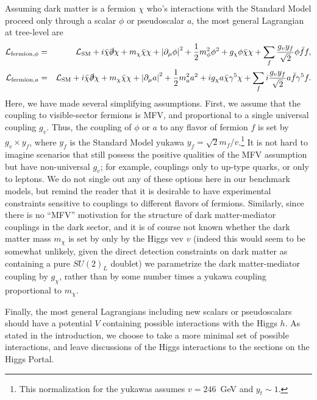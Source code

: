 Assuming dark matter is a fermion $\chi$ who's interactions with the Standard Model proceed only through a scalar $\phi$ or pseudoscalar $a$, the most general Lagrangian at tree-level are
\begin{eqnarray}
{\cal L}_{{\rm fermion},\phi} & = & {\cal L}_{\rm SM}+i\bar{\chi} \slashed{\partial} \chi + m_\chi \bar{\chi}\chi + \left| \partial_\mu \phi \right|^2+\frac{1}{2}m_\phi^2 \phi^2 + g_\chi \phi \bar{\chi}\chi+ \sum_f \frac{g_v y_f}{\sqrt{2}} \phi \bar{f} f, \label{eq:scalarlag} \\
{\cal L}_{{\rm fermion},a} & = & {\cal L}_{\rm SM}+i\bar{\chi} \slashed{\partial} \chi + m_\chi \bar{\chi}\chi + \left| \partial_\mu a \right|^2+\frac{1}{2}m_a^2 a^2 + i g_\chi a \bar{\chi}\gamma^5 \chi+ \sum_f i \frac{g_v y_f}{\sqrt{2}} a \bar{f}\gamma^5 f. \label{eq:pseudoscalarlag}
\end{eqnarray}
Here, we have made several simplifying assumptions. First, we assume that the coupling to visible-sector fermions is MFV, and proportional to a single universal coupling $g_v$. Thus, the coupling of $\phi$ or $a$ to any flavor of fermion $f$ is set by $g_v \times y_f$, where $y_f$ is the Standard Model yukawa $y_f = \sqrt{2}m_f/v$.\footnote{This normalization for the yukawas assumes $v = 246$~GeV and $y_t \sim 1$.} It is not hard to imagine scenarios that still possess the positive qualities of the MFV assumption but have non-universal $g_v$; for example, couplings only to up-type quarks, or only to leptons. We do not single out any of these options here in our benchmark models, but remind the reader that it is desirable to have experimental constraints sensitive to couplings to different flavors of fermions. Similarly, since there is no ``MFV'' motivation for the structure of dark matter-mediator couplings in the dark sector, and it is of course not known whether the dark matter mass $m_\chi$ is set by only by the Higgs vev $v$ (indeed this would seem to be somewhat unlikely, given the direct detection constraints on dark matter as containing a pure $SU(2)_L$ doublet) we parametrize the dark matter-mediator coupling by $g_\chi$, rather than by some number times a yukawa coupling proportional to $m_\chi$. 

Finally, the most general Lagrangians including new scalars or pseudoscalars should have a potential $V$ containing possible interactions with the Higgs $h$. As stated in the introduction, we choose to take a more minimal set of possible interactions, and leave discussions of the Higgs interactions to the sections on the Higgs Portal.

